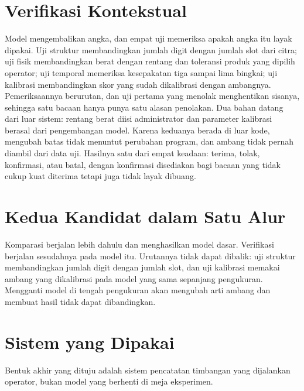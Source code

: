 \documentclass[12pt,a4paper,oneside]{report}
\begin{document}
\section{Verifikasi Kontekstual}

Model mengembalikan angka, dan empat uji memeriksa apakah angka itu layak dipakai.
Uji struktur membandingkan jumlah digit dengan jumlah slot dari citra; uji fisik
membandingkan berat dengan rentang dan toleransi produk yang dipilih operator; uji
temporal memeriksa kesepakatan tiga sampai lima bingkai; uji kalibrasi
membandingkan skor yang sudah dikalibrasi dengan ambangnya. Pemeriksaannya
berurutan, dan uji pertama yang menolak menghentikan sisanya, sehingga satu bacaan
hanya punya satu alasan penolakan. Dua bahan datang dari luar sistem: rentang berat
diisi administrator dan parameter kalibrasi berasal dari pengembangan model. Karena
keduanya berada di luar kode, mengubah batas tidak menuntut perubahan program, dan
ambang tidak pernah diambil dari data uji. Hasilnya satu dari empat keadaan:
terima, tolak, konfirmasi, atau batal, dengan konfirmasi disediakan bagi bacaan
yang tidak cukup kuat diterima tetapi juga tidak layak dibuang.

\section{Kedua Kandidat dalam Satu Alur}

Komparasi berjalan lebih dahulu dan menghasilkan model dasar. Verifikasi berjalan
sesudahnya pada model itu. Urutannya tidak dapat dibalik: uji struktur
membandingkan jumlah digit dengan jumlah slot, dan uji kalibrasi memakai ambang
yang dikalibrasi pada model yang sama sepanjang pengukuran. Mengganti model di
tengah pengukuran akan mengubah arti ambang dan membuat hasil tidak dapat
dibandingkan.

\section{Sistem yang Dipakai}

Bentuk akhir yang dituju adalah sistem pencatatan timbangan yang dijalankan
operator, bukan model yang berhenti di meja eksperimen.
\end{document}
